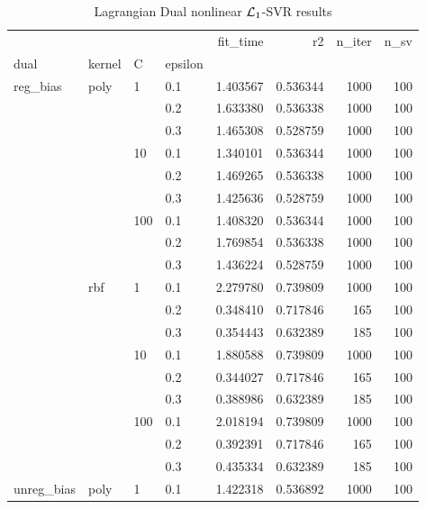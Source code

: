 \begin{table}[H]
\centering
\caption{Lagrangian Dual nonlinear $\protect \mathcal{L}_1$-SVR results}
\label{nonlinear_lagrangian_dual_l1_svr_cv_results}
\begin{tabular}{llllrrrr}
\toprule
           &     &     &     &  fit\_time &        r2 &  n\_iter &  n\_sv \\
dual & kernel & C & epsilon &           &           &         &       \\
\midrule
reg\_bias & poly & 1   & 0.1 &  1.403567 &  0.536344 &    1000 &   100 \\
           &     &     & 0.2 &  1.633380 &  0.536338 &    1000 &   100 \\
           &     &     & 0.3 &  1.465308 &  0.528759 &    1000 &   100 \\
           &     & 10  & 0.1 &  1.340101 &  0.536344 &    1000 &   100 \\
           &     &     & 0.2 &  1.469265 &  0.536338 &    1000 &   100 \\
           &     &     & 0.3 &  1.425636 &  0.528759 &    1000 &   100 \\
           &     & 100 & 0.1 &  1.408320 &  0.536344 &    1000 &   100 \\
           &     &     & 0.2 &  1.769854 &  0.536338 &    1000 &   100 \\
           &     &     & 0.3 &  1.436224 &  0.528759 &    1000 &   100 \\
           & rbf & 1   & 0.1 &  2.279780 &  0.739809 &    1000 &   100 \\
           &     &     & 0.2 &  0.348410 &  0.717846 &     165 &   100 \\
           &     &     & 0.3 &  0.354443 &  0.632389 &     185 &   100 \\
           &     & 10  & 0.1 &  1.880588 &  0.739809 &    1000 &   100 \\
           &     &     & 0.2 &  0.344027 &  0.717846 &     165 &   100 \\
           &     &     & 0.3 &  0.388986 &  0.632389 &     185 &   100 \\
           &     & 100 & 0.1 &  2.018194 &  0.739809 &    1000 &   100 \\
           &     &     & 0.2 &  0.392391 &  0.717846 &     165 &   100 \\
           &     &     & 0.3 &  0.435334 &  0.632389 &     185 &   100 \\
unreg\_bias & poly & 1   & 0.1 &  1.422318 &  0.536892 &    1000 &   100 \\

\end{tabular}
\end{table}
